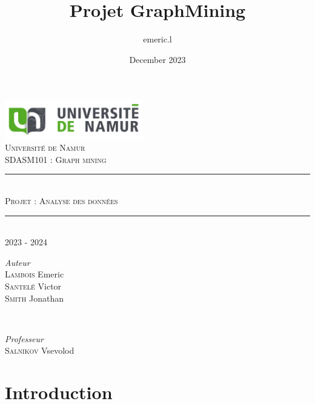 \documentclass{article}
\title{Projet GraphMining}
\author{emeric.l }
\date{December 2023}
\begin{document}
\begin{titlepage}
    \newcommand{\HRule}{\rule{\linewidth}{0.5mm}}
    \center

    \includegraphics[width=6cm]{assets/logo_unamur}
    \\[2cm]

    \textsc{\LARGE Université de Namur}
    \\[2cm]

    \textsc{\Large SDASM101 : Graph mining }
    \\[0.2cm]

    \HRule
    \\[0.4cm]
    \textsc{\huge Projet : Analyse des données}
    \\[0.2cm]
    \HRule
    \\[0.4cm]
    {\large 2023 - 2024}
    \\[8.2cm]

    \begin{minipage}{0.5\textwidth}
        \begin{flushleft}
            \emph{Auteur}
            \\
            \textsc{Lambois} Emeric
            \\
            \textsc{Santelé} Victor
            \\
            \textsc{Smith} Jonathan
            \\
        \end{flushleft}
    \end{minipage}
    ~
    \begin{minipage}{0.4\textwidth}
        \begin{flushright}
            \emph{Professeur}
            \\
            \textsc{Salnikov} Vsevolod
            \\
        \end{flushright}
    \end{minipage}

\end{titlepage}

\tableofcontents
\newpage

\section{Introduction}
\end{document}
